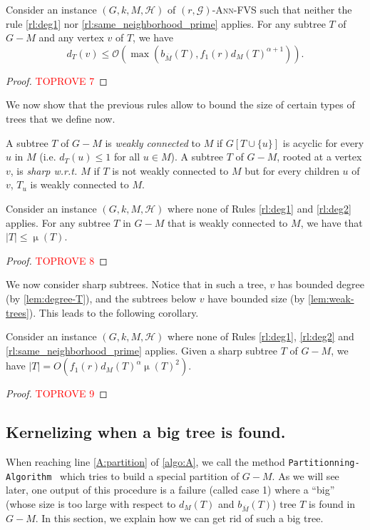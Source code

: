 \documentclass{amsart}
\newcommand{\algopart }{\texttt{Partitionning-Algorithm}~ }
\newcommand{\G}{\mathcal{G}}
\newcommand{\bom}{b_{\overline{M}}}
\newcommand{\mH}{\mathcal{H}}
\DeclareMathOperator\db{\mu}
\newcommand{\AFVS}{\textsc{$(r,\G)$-Ann-FVS}\xspace}
\newcommand{\ruleref}[1]{\hyperref[#1]{\ref*{#1}}}
\renewcommand{\O}{\mathcal{O}}
\begin{document}
\begin{lemma}\label{lem:degree-T}
Consider an instance $(G,k,M,\mH)$ of \AFVS such that neither the rule \ruleref{rl:deg1} nor \ruleref{rl:same_neighborhood_prime} applies.
For any subtree $T$ of $G- M$ and any vertex $v$ of $T$,  we have
\[
d_{T}(v)\le \O(\max(\bom(T),f_1(r)d_M(T)^{\alpha+1})).
\]
\end{lemma}


\begin{proof}\textcolor{red}{TOPROVE 7}\end{proof}


We now show that the previous rules allow to bound the size of certain types of trees that we define now.

\begin{definition}
A subtree $T$ of $G-M$ is \emph{weakly connected} to $M$ if $G[T\cup \{u\}]$ is acyclic for every $u$ in $M$ (i.e. $d_T(u)\leq 1$ for all $u\in M$).
A subtree $T$ of $G- M$, rooted at a vertex $v$, is \emph{sharp w.r.t. $M$} if $T$ is not weakly connected to $M$ but for every children $u$ of $v$, $T_u$ is weakly connected to $M$.
\end{definition}

\begin{lemma}\label{lem:weak-trees}
Consider an instance $(G,k,M,\mH)$ where none of Rules \ruleref{rl:deg1} and \ruleref{rl:deg2} applies. For any subtree $T$ in $G- M$ that is weakly connected to $M$, we have that $|T|\le \db(T)$.
\end{lemma}
\begin{proof}\textcolor{red}{TOPROVE 8}\end{proof}

We now consider sharp subtrees. Notice that in such a tree, $v$ has bounded degree (by \autoref{lem:degree-T}), and the subtrees below $v$ have bounded size (by \autoref{lem:weak-trees}). This leads to the following corollary.

\begin{corollary}\label{cor:sharpsize}
Consider an instance $(G,k,M,\mH)$ where none of Rules \ruleref{rl:deg1}, \ruleref{rl:deg2} and \ruleref{rl:same_neighborhood_prime} applies. Given a sharp subtree $T$ of $G-M$, we have $|T| = O\left(f_1(r)d_M(T)^\alpha\db(T)^2\right)$. 
\end{corollary}
\begin{proof}\textcolor{red}{TOPROVE 9}\end{proof}




\subsection{Kernelizing when a big tree is found.}\label{sec:bigT}
When reaching line \ref{A:partition} of \autoref{algo:A}, we call the method \algopart which tries to build a special partition of $G-M$. As we will see later, one output of this procedure is a failure (called case 1) where a ``big'' (whose size is too large with respect to $d_M(T)$ and $\bom(T)$) tree $T$ is found in $G-M$. 
In this section, we explain how we can get rid of such a big tree.
\end{document}
